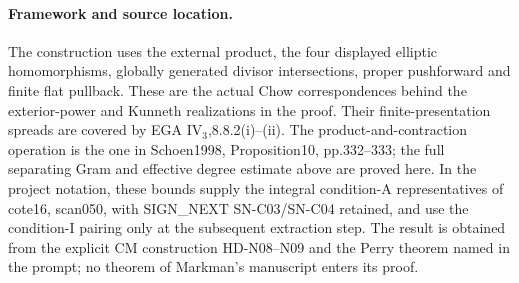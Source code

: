 \paragraph{Framework and source location.}
The construction uses the external product, the four displayed
elliptic homomorphisms, globally generated divisor intersections,
proper pushforward and finite flat pullback. These are the actual
Chow correspondences behind the exterior-power and Kunneth
realizations in the proof. Their finite-presentation spreads are
covered by EGA IV$_3$,8.8.2(i)--(ii). The product-and-contraction
operation is the one in Schoen1998, Proposition10, pp.332--333;
the full separating Gram and effective degree estimate above are
proved here. In the project notation, these bounds supply the
integral condition-A representatives of cote16, scan050, with
SIGN\_NEXT SN-C03/SN-C04 retained, and use the condition-I pairing
only at the subsequent extraction step. The result is obtained from
the explicit CM construction HD-N08--N09 and the Perry theorem named
in the prompt; no theorem of Markman's manuscript enters its proof.
